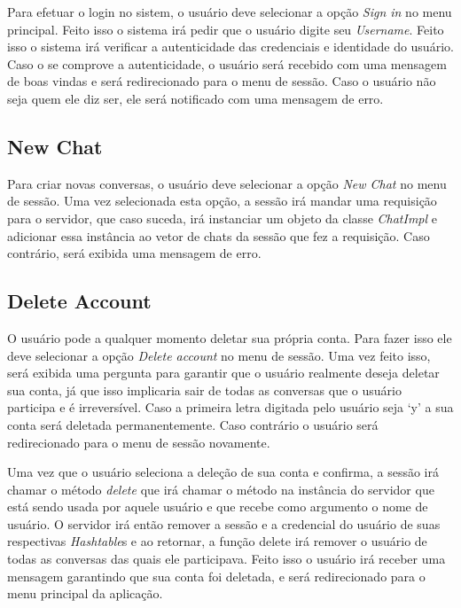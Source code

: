 \documentclass[../main.tex]{subfiles}
\begin{document}
Para efetuar o login no sistem, o usuário deve selecionar a opção \textit{Sign in} no menu principal.
Feito isso o sistema irá pedir que o usuário digite seu \textit{Username}. Feito isso o sistema irá verificar a autenticidade das credenciais e identidade do usuário. Caso o se comprove a autenticidade, o usuário será recebido com uma mensagem de boas vindas e será redirecionado para o menu de sessão. Caso o usuário não seja quem ele diz ser, ele será notificado com uma mensagem de erro.

\subsection{New Chat}

Para criar novas conversas, o usuário deve selecionar a opção \textit{New Chat} no menu de sessão.
Uma vez selecionada esta opção, a sessão irá mandar uma requisição para o servidor, que caso suceda, irá instanciar um objeto da classe \textit{ChatImpl} e adicionar essa instância ao vetor de chats da sessão que fez a requisição. Caso contrário, será exibida uma mensagem de erro.

\subsection{Delete Account}

O usuário pode a qualquer momento deletar sua própria conta. Para fazer isso ele deve selecionar a opção \textit{Delete account} no menu de sessão. Uma vez feito isso, será exibida uma pergunta para garantir que o usuário realmente deseja deletar sua conta, já que isso implicaria sair de todas as conversas que o usuário participa e é irreversível. Caso a primeira letra digitada pelo usuário seja `y' a sua conta será deletada permanentemente. Caso contrário o usuário será redirecionado para o menu de sessão novamente.

Uma vez que o usuário seleciona a deleção de sua conta e confirma, a sessão irá chamar o método \textit{delete} que irá chamar o método  na instância do servidor que está sendo usada por aquele usuário e que recebe como argumento o nome de usuário. O servidor irá então remover a sessão e a credencial do usuário de suas respectivas \textit{Hashtable}s e ao retornar, a função delete irá remover o usuário de todas as conversas das quais ele participava. Feito isso o usuário irá receber uma mensagem garantindo que sua conta foi deletada, e será redirecionado para o menu principal da aplicação.
\end{document}
